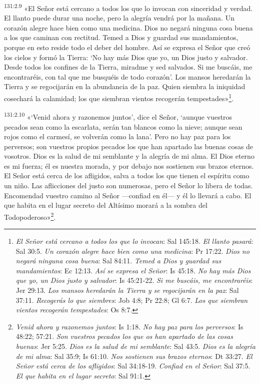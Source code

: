 \par 
\textsuperscript{131:2.9} «El Señor está cercano a todos los que lo invocan con sinceridad y verdad. El llanto puede durar una noche, pero la alegría vendrá por la mañana. Un corazón alegre hace bien como una medicina. Dios no negará ninguna cosa buena a los que caminan con rectitud. Temed a Dios y guardad sus mandamientos, porque en esto reside todo el deber del hombre. Así se expresa el Señor que creó los cielos y formó la Tierra: `No hay más Dios que yo, un Dios justo y salvador. Desde todos los confines de la Tierra, miradme y sed salvados. Si me buscáis, me encontraréis, con tal que me busquéis de todo corazón'. Los mansos heredarán la Tierra y se regocijarán en la abundancia de la paz. Quien siembra la iniquidad cosechará la calamidad; los que siembran vientos recogerán tempestades»\footnote{\textit{El Señor está cercano a todos los que lo invocan}: Sal 145:18. \textit{El llanto pasará}: Sal 30:5. \textit{Un corazón alegre hace bien como una medicina}: Pr 17:22. \textit{Dios no negará ninguna cosa buena}: Sal 84:11. \textit{Temed a Dios y guardad sus mandamientos}: Ec 12:13. \textit{Así se expresa el Señor}: Is 45:18. \textit{No hay más Dios que yo, un Dios justo y salvador}: Is 45:21-22. \textit{Si me buscáis, me encontraréis}: Jer 29:13. \textit{Los mansos heredarán la Tierra y se regocijarán en la paz}: Sal 37:11. \textit{Recogerás lo que siembres}: Job 4:8; Pr 22:8; Gl 6:7. \textit{Los que siembran vientos recogerán tempestades}: Os 8:7.}.

\par 
\textsuperscript{131:2.10} «`Venid ahora y razonemos juntos', dice el Señor, `aunque vuestros pecados sean como la escarlata, serán tan blancos como la nieve; aunque sean rojos como el carmesí, se volverán como la lana'. Pero no hay paz para los perversos; son vuestros propios pecados los que han apartado las buenas cosas de vosotros. Dios es la salud de mi semblante y la alegría de mi alma. El Dios eterno es mi fuerza; él es nuestra morada, y por debajo nos sostienen sus brazos eternos. El Señor está cerca de los afligidos, salva a todos los que tienen el espíritu como un niño. Las aflicciones del justo son numerosas, pero el Señor lo libera de todas. Encomendad vuestro camino al Señor ---confiad en él--- y él lo llevará a cabo. El que habita en el lugar secreto del Altísimo morará a la sombra del Todopoderoso»\footnote{\textit{Venid ahora y razonemos juntos}: Is 1:18. \textit{No hay paz para los perversos}: Is 48:22; 57:21. \textit{Son vuestros pecados los que os han apartado de las cosas buenas}: Jer 5:25. \textit{Dios es la salud de mi semblante}: Sal 43:5. \textit{Dios es la alegría de mi alma}: Sal 35:9; Is 61:10. \textit{Nos sostienen sus brazos eternos}: Dt 33:27. \textit{El Señor está cerca de los afligidos}: Sal 34:18-19. \textit{Confiad en el Señor}: Sal 37:5. \textit{El que habita en el lugar secreto}: Sal 91:1.}.

